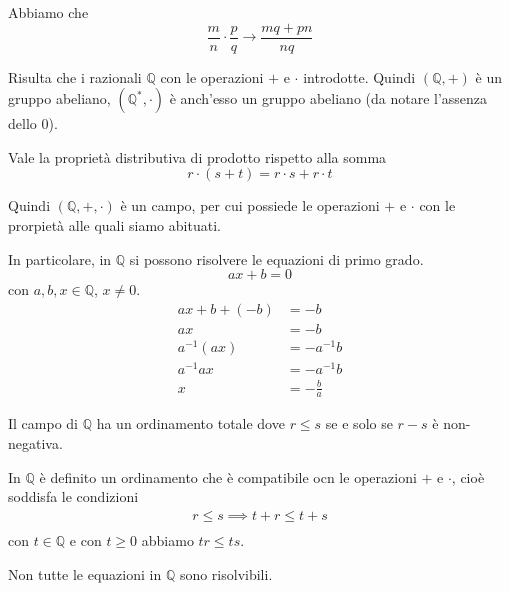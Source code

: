 \documentclass[a4paper]{article}
\begin{document}
Abbiamo che
\[
    \frac{m}{n} \cdot \frac{p}{q} \to \frac{mq+pn}{nq}
\]

Risulta che i razionali \(\mathbb{Q}\) con le operazioni \(+\) e \(\cdot\) introdotte.
Quindi \((\mathbb{Q}, +)\) è un gruppo abeliano, \(({\mathbb{Q}}^*, \cdot)\) è anch'esso un gruppo abeliano
(da notare l'assenza dello 0).

Vale la proprietà distributiva di prodotto rispetto alla somma
\[ r\cdot (s+t) = r\cdot s + r\cdot t \]

Quindi \((\mathbb{Q}, +, \cdot)\) è un campo, per cui possiede le operazioni \(+\) e \(\cdot\)
con le prorpietà alle quali siamo abituati.

\pagebreak

In particolare, in \(\mathbb{Q}\) si possono risolvere le equazioni di primo grado.
\[
    ax+b=0
\]
con \(a,b,x\in\mathbb{Q}\), \(x\neq 0\).
\begin{align*}
    ax+b+(-b)&=-b \\
    ax&= -b \\
    a^{-1}(ax) &= -a^{-1}b \\
    a^{-1}ax &= -a^{-1}b \\
    x &= -\frac{b}{a} 
\end{align*}

Il campo di \(\mathbb{Q}\) ha un ordinamento totale dove \(r \leq s\) se e solo se \(r - s\) è
non-negativa.

In \(\mathbb{Q}\) è definito un ordinamento che è compatibile ocn le operazioni \(+\) e \(\cdot\),
cioè soddisfa le condizioni
\begin{align*}
    r \leq s \implies t + r \leq t + s \\
\end{align*}
con \(t\in \mathbb{Q}\) e con \(t \geq 0\) abbiamo \(tr \leq ts\).


Non tutte le equazioni in \(\mathbb{Q}\) sono risolvibili.


\end{document}

